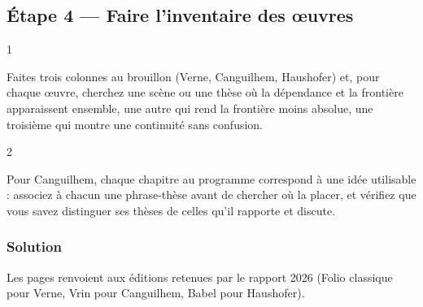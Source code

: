 \documentclass[11pt,a4paper]{article}
\begin{document}
\hypertarget{uxe9tape-4-faire-linventaire-des-ux153uvres}{%
\subsection{Étape 4 --- Faire l'inventaire des œuvres}\label{uxe9tape-4-faire-linventaire-des-ux153uvres}}

\begin{indication}{1}

Faites trois colonnes au brouillon (Verne, Canguilhem, Haushofer) et, pour chaque œuvre, cherchez une scène ou une thèse où la dépendance et la frontière apparaissent ensemble, une autre qui rend la frontière moins absolue, une troisième qui montre une continuité sans confusion.

\end{indication}

\begin{indication}{2}

Pour Canguilhem, chaque chapitre au programme correspond à une idée utilisable : associez à chacun une phrase-thèse avant de chercher où la placer, et vérifiez que vous savez distinguer ses thèses de celles qu'il rapporte et discute.

\end{indication}

\hypertarget{solution-3}{%
\subsubsection{Solution}\label{solution-3}}

Les pages renvoient aux éditions retenues par le rapport 2026 (Folio classique pour Verne, Vrin pour Canguilhem, Babel pour Haushofer).
\end{document}
